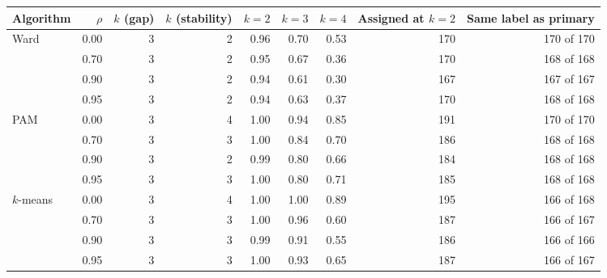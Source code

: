 \begin{tabular}{lrrrrrrrr}
\toprule
Algorithm & $\rho$ & $k$ (gap) & $k$ (stability) & $k = 2$ & $k = 3$ & $k = 4$ & Assigned at $k = 2$ & Same label as primary \\
\midrule
Ward & 0.00 & 3 & 2 & 0.96 & 0.70 & 0.53 & 170 & 170 of 170 \\
 & 0.70 & 3 & 2 & 0.95 & 0.67 & 0.36 & 170 & 168 of 168 \\
 & 0.90 & 3 & 2 & 0.94 & 0.61 & 0.30 & 167 & 167 of 167 \\
 & 0.95 & 3 & 2 & 0.94 & 0.63 & 0.37 & 170 & 168 of 168 \\
PAM & 0.00 & 3 & 4 & 1.00 & 0.94 & 0.85 & 191 & 170 of 170 \\
 & 0.70 & 3 & 3 & 1.00 & 0.84 & 0.70 & 186 & 168 of 168 \\
 & 0.90 & 3 & 2 & 0.99 & 0.80 & 0.66 & 184 & 168 of 168 \\
 & 0.95 & 3 & 3 & 1.00 & 0.80 & 0.71 & 185 & 168 of 168 \\
$k$-means & 0.00 & 3 & 4 & 1.00 & 1.00 & 0.89 & 195 & 166 of 168 \\
 & 0.70 & 3 & 3 & 1.00 & 0.96 & 0.60 & 187 & 166 of 167 \\
 & 0.90 & 3 & 3 & 0.99 & 0.91 & 0.55 & 186 & 166 of 166 \\
 & 0.95 & 3 & 3 & 1.00 & 0.93 & 0.65 & 187 & 166 of 167 \\
\bottomrule
\end{tabular}
